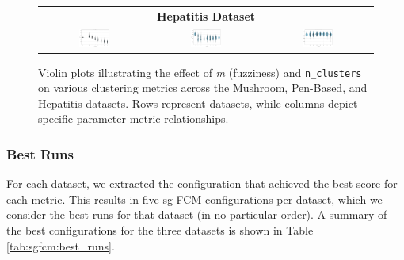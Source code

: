 \begin{figure}[H]
{\begin{tabular}{ccc}
			\multicolumn{3}{c}{\textbf{Hepatitis Dataset}} \\ 
			\includegraphics[width=0.30\textwidth]{figures/FuzzyCMeans/Hepatitis/violin_n_clusters_vs_DBI.png} &
			\includegraphics[width=0.30\textwidth]{figures/FuzzyCMeans/Hepatitis/violin_n_clusters_vs_NMI.png} &
			\includegraphics[width=0.30\textwidth]{figures/FuzzyCMeans/Hepatitis/violin_fuzziness_vs_Silhouette.png} \\
		\end{tabular}
	}
	\caption{Violin plots illustrating the effect of \textit{m} (fuzziness) and \texttt{n\_clusters} on various clustering metrics across the Mushroom, Pen-Based, and Hepatitis datasets. Rows represent datasets, while columns depict specific parameter-metric relationships.}
	\label{fig:unified_parameter_study}
\end{figure}

\subsubsection{Best Runs}
For each dataset, we extracted the configuration that achieved the best score for each metric. This results in five sg-FCM configurations per dataset, which we consider the best runs for that dataset (in no particular order). A summary of the best configurations for the three datasets is shown in Table \ref{tab:sgfcm:best_runs}.

